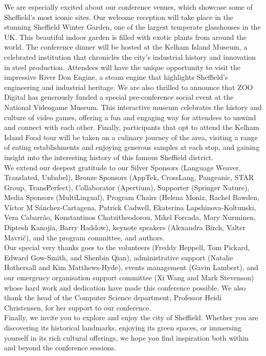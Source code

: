 We are especially excited about our conference venues, which showcase some of Sheffield’s most iconic sites. Our welcome reception will take place in the stunning Sheffield Winter Garden, one of the largest temperate glasshouses in the UK. This beautiful indoor garden is filled with exotic plants from around the world. The conference dinner will be hosted at the Kelham Island Museum, a celebrated institution that chronicles the city’s industrial history and innovation in steel production. Attendees will have the unique opportunity to visit the impressive River Don Engine, a steam engine that highlights Sheffield’s engineering and industrial heritage. We are also thrilled to announce that ZOO Digital has generously funded a special pre-conference social event at the National Videogame Museum. This interactive museum celebrates the history and culture of video games, offering a fun and engaging way for attendees to unwind and connect with each other. Finally, participants that opt to attend the Kelham Island Food tour will be taken on a culinary journey of the area, visiting a range of eating establishments and enjoying generous samples at each stop, and gaining insight into the interesting history of this famous Sheffield district.
\\

We extend our deepest gratitude to our Silver Sponsors (Language Weaver, Translated, Unbabel), Bronze Sponsors (AppTek, CrossLang, Pangeanic, STAR Group, TransPerfect), Collaborator (Apertium), Supporter (Springer Nature), Media Sponsors (MultiLingual), Program Chairs (Helena Moniz, Rachel Bawden, Víctor M Sánchez-Cartagena, Patrick Cadwell, Ekaterina Lapshinova-Koltunski, Vera Cabarrão, Konstantinos Chatzitheodorou, Mikel Forcada, Mary Nurminen, Diptesh Kanojia, Barry Haddow), keynote speakers (Alexandra Birch, Valter Mavrič), and the program committee, and authors.
\\

Our special very thanks goes to the volunteers (Freddy Heppell, Tom Pickard, Edward Gow-Smith, and Shenbin Qian), administrative support (Natalie Hothersall and Kim Matthews-Hyde), events management (Gavin Lambert), and our emergency organisation support committee (Xi Wang and Mark Stevenson) whose hard work and dedication have made this conference possible. We also thank the head of the Computer Science department, Professor Heidi Christensen, for her support to our conference. 
\\

Finally, we invite you to explore and enjoy the city of Sheffield. Whether you are discovering its historical landmarks, enjoying its green spaces, or immersing yourself in its rich cultural offerings, we hope you find inspiration both within and beyond the conference sessions.
\\

